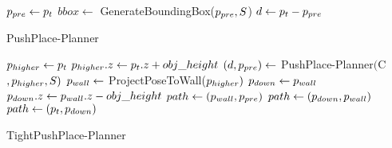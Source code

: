

\begin{algorithm}
\small
\DontPrintSemicolon
{}
$p_{pre} \gets p_t$ \;
 $bbox \gets$ GenerateBoundingBox($p_{pre}, S$)  \;
$d \gets p_t - p_{pre}$\;
\;
\caption{{\sc PushPlace-Planner}}
\label{algo:PushPlace}
\end{algorithm}

\begin{algorithm}
\small
\DontPrintSemicolon
{}
$p_{higher} \gets p_{t}   $\;
$p_{higher}.z \gets p_{t}.z + obj\_height   $\;
$(d, p_{pre}) \gets$ PushPlace-Planner$($C$, p_{higher}, S)$  \;
$p_{wall} \gets$ ProjectPoseToWall($p_{higher})$   \;
$p_{down} \gets p_{wall}$  \;
$p_{down}.z \gets p_{wall}.z - obj\_height$   \;
$path \gets (p_{wall}, p_{pre})$   \;
$path \gets (p_{down}, p_{wall})$\;
$path   \gets (p_{t}, p_{down})$    \;
\; 
\caption{{\sc TightPushPlace-Planner}}
\label{algo:TightPushPlace}
\end{algorithm}



